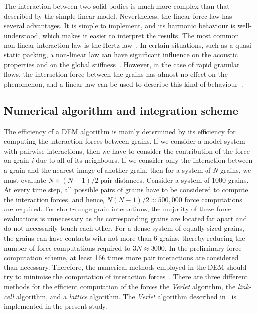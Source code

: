 The interaction between two solid bodies is much more complex than that 
described by the simple linear model. Nevertheless, the linear force law has 
several advantages. It is simple to implement, and its harmonic behaviour is 
well-understood, which makes it easier to interpret the results. The 
most common non-linear interaction law is the Hertz law~\citep{Hertz1882}. In 
certain situations, such as a quasi-static packing, a non-linear law can have 
significant influence on the acoustic properties and on the global 
stiffness~\citep{Agnolin2007}. However, in the case of rapid granular flows, 
the interaction force between the grains has almost no effect on the 
phenomenon, and a linear law can be used to describe this kind of 
behaviour~\citep{Radjai2011}. 


\subsection{Numerical algorithm and integration scheme}
The efficiency of a DEM algorithm is mainly determined by 
its efficiency for computing the interaction forces between grains. If we 
consider a model system with pairwise interactions, then we have to consider 
the contribution of the force on grain \textit{i} due to all of its neighbours. 
If we consider only the interaction between a grain and the nearest image of 
another grain, then for a system of \textit{N} grains, we must evaluate $N 
\times (N-1)/2$ pair distances. Consider a system of 1000 grains. At every time 
step, all possible pairs of grains have to be considered to compute the 
interaction forces, and hence, $\mathit{N}(\mathit{N}-1)/2 \approx 500,000$ 
force 
computations are required. For short-range grain interactions, the majority of 
these force evaluations is unnecessary as the corresponding grains are located 
far apart and do not necessarily touch each other. For a dense system of 
equally sized grains, the grains can have contacts with not more than 6 grains, 
thereby reducing the number of force computations required to $3\mathit{N} 
\approx 
3000$. In the preliminary force computation scheme, at least 166 times more 
pair interactions are considered than necessary. Therefore, the numerical 
methods employed in the DEM should try to minimise the computation of 
interaction forces~\citep{Poschel2005}. There are three different methods for 
the efficient computation of the forces the \textit{Verlet} algorithm, the 
\textit{link-cell} algorithm, and a \textit{lattice} algorithm. The 
\textit{Verlet} algorithm described in~\citet{Grubmuller1991} 
is implemented in the present study.

